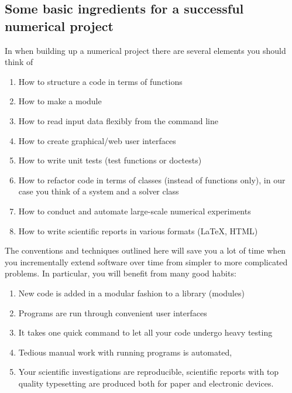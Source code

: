 \documentclass[%
twoside,                 %
final,                   %
10pt]{article}
\begin{document}
\subsection{Some basic ingredients for a successful numerical project}

In when building up a numerical project there are several elements you should think of
\begin{enumerate}
  \item How to structure a code in terms of functions

  \item How to make a module

  \item How to read input data flexibly from the command line

  \item How to create graphical/web user interfaces

  \item How to write unit tests (test functions or doctests)

  \item How to refactor code in terms of classes (instead of functions only), in our case you think of a system and a solver class

  \item How to conduct and automate large-scale numerical experiments

  \item How to write scientific reports in various formats ({\LaTeX}, HTML)
\end{enumerate}

\noindent
The conventions and techniques outlined here will save you a lot of time when you incrementally extend software over time from simpler to more complicated problems. In particular, you will benefit from many good habits:
\begin{enumerate}
\item New code is added in a modular fashion to a library (modules)

\item Programs are run through convenient user interfaces

\item It takes one quick command to let all your code undergo heavy testing 

\item Tedious manual work with running programs is automated,

\item Your scientific investigations are reproducible, scientific reports with top quality typesetting are produced both for paper and electronic devices.
\end{enumerate}
\end{document}
